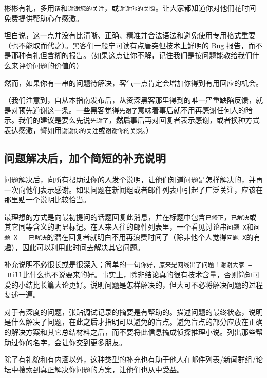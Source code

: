 \documentclass[titlepage]{article}
\begin{document}
彬彬有礼，多用\texttt{请}和\texttt{谢谢您的关注}，或\texttt{谢谢你的关照}。让大家都知道你对他们花时间免费提供帮助心存感激。

坦白说，这一点并没有比清晰、正确、精准并合法语法和避免使用专用格式重要（也不能取而代之）。黑客们一般宁可读有点唐突但技术上鲜明的
Bug
报告，而不是那种有礼但含糊的报告。（如果这点让你不解，记住我们是按问题能教给我们什么来评价问题的价值的）

然而，如果你有一串的问题待解决，客气一点肯定会增加你得到有用回应的机会。

（我们注意到，自从本指南发布后，从资深黑客那里得到的唯一严重缺陷反馈，就是对预先道谢这一条。一些黑客觉得\texttt{先谢了}意味着事后就不用再感谢任何人的暗示。我们的建议是要么先说\texttt{先谢了}，\textbf{然后}事后再对回复者表示感谢，或者换种方式表达感激，譬如用\texttt{谢谢你的关注}或\texttt{谢谢你的关照}。）

\hypertarget{ux95eeux9898ux89e3ux51b3ux540eux52a0ux4e2aux7b80ux77edux7684ux8865ux5145ux8bf4ux660e}{\subsection{问题解决后，加个简短的补充说明}\label{ux95eeux9898ux89e3ux51b3ux540eux52a0ux4e2aux7b80ux77edux7684ux8865ux5145ux8bf4ux660e}}

问题解决后，向所有帮助过你的人发个说明，让他们知道问题是怎样解决的，并再一次向他们表示感谢。如果问题在新闻组或者邮件列表中引起了广泛关注，应该在那里贴一个说明比较恰当。

最理想的方式是向最初提问的话题回复此消息，并在标题中包含\texttt{已修正}，\texttt{已解决}或其它同等含义的明显标记。在人来人往的邮件列表里，一个看见讨论串\texttt{问题\ X}和\texttt{问题\ X\ -\ 已解决}的潜在回复者就明白不用再浪费时间了（除非他个人觉得\texttt{问题\ X}的有趣），因此可以利用此时间去解决其它问题。

补充说明不必很长或是很深入；简单的一句\texttt{你好，原来是网线出了问题！谢谢大家\ –\ Bill}比什么也不说要来的好。事实上，除非结论真的很有技术含量，否则简短可爱的小结比长篇大论更好。说明问题是怎样解决的，但大可不必将解决问题的过程复述一遍。

对于有深度的问题，张贴调试记录的摘要是有帮助的。描述问题的最终状态，说明是什么解决了问题，在此\textbf{之后}才指明可以避免的盲点。避免盲点的部分应放在正确的解决方案和其它总结材料之后，而不要将此信息搞成侦探推理小说。列出那些帮助过你的名字，会让你交到更多朋友。

除了有礼貌和有内涵以外，这种类型的补充也有助于他人在邮件列表/新闻群组/论坛中搜索到真正解决你问题的方案，让他们也从中受益。
\end{document}
